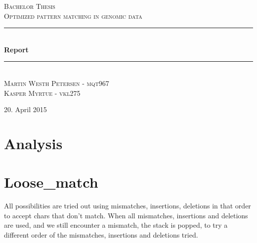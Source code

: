 \documentclass[12pt]{article}
\newcommand{\HRule}{\rule{\linewidth}{0.5mm}}
\begin{document}
\begin{titlepage}
\begin{center}

\textsc{\Large Bachelor Thesis \\ Optimized pattern matching in genomic data\\[0.3cm]}
\HRule \\[0.4cm]
{ \LARGE \bfseries Report}\\[0.4cm]
\HRule \\[1.2cm]
\textsc{\large Martin Westh Petersen - mqt967 \\ Kasper Myrtue - vkl275}\\[1.0cm]
\end{center}
\begin{center}
\vfill
{\large 20. April 2015}
\end{center}
\end{titlepage}
\tableofcontents \newpage

\section{Analysis}
\section{Loose\_match}
All possibilities are tried out using mismatches, insertions, deletions in that order to accept chars that don't match.
When all mismatches, insertions and deletions are used, and we still encounter a mismatch, the stack is popped, to
try a different order of the mismatches, insertions and deletions tried.
\end{document}
